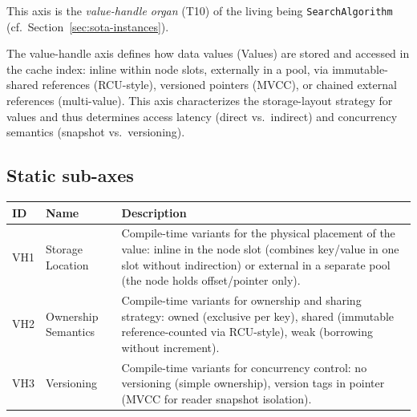 This axis is the \emph{value-handle organ} (T10) of the living being \texttt{SearchAlgorithm} (cf.\ Section~\ref{sec:sota-instances}).

The value-handle axis defines how data values (Values) are stored and accessed in the cache index: inline within node slots, externally in a pool, via immutable-shared references (RCU-style), versioned pointers (MVCC), or chained external references (multi-value). This axis characterizes the storage-layout strategy for values and thus determines access latency (direct vs.\ indirect) and concurrency semantics (snapshot vs.\ versioning).

\subsection*{Static sub-axes}
\begin{scriptsize}
\begin{longtable}{@{}>{\raggedright\arraybackslash}p{1.8cm} >{\raggedright\arraybackslash}p{3.2cm} >{\raggedright\arraybackslash}p{8.5cm}@{}}
\toprule
ID & Name & Description \\
\midrule
\endhead%
VH1 & Storage Location & Compile-time variants for the physical placement of the value: inline in the node slot (combines key/\allowbreak{}value in one slot without indirection) or external in a separate pool (the node holds offset/\allowbreak{}pointer only). \\
VH2 & Ownership Semantics & Compile-time variants for ownership and sharing strategy: owned (exclusive per key), shared (immutable reference-counted via RCU-style), weak (borrowing without increment). \\
VH3 & Versioning & Compile-time variants for concurrency control: no versioning (simple ownership), version tags in pointer (MVCC for reader snapshot isolation). \\
\bottomrule
\end{longtable}
\end{scriptsize}

